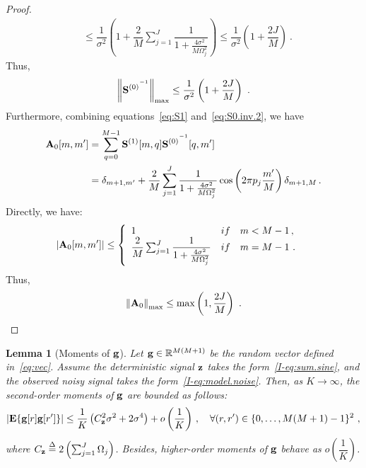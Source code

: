 \documentclass[journal,onecolumn]{IEEEtran}
\newtheorem{lemma}{Lemma}
\begin{document}
\begin{proof}
\begin{align*}
&\leq \dfrac1{\sigma^2}\left( 1+\dfrac{2}{M}\sum_{j=1}^J\dfrac{1}{1+\frac{4\sigma^2}{M\Omega_j^2}} \right) \leq \dfrac1{\sigma^2}\left( 1+\dfrac{2J}{M} \right)\ .
\end{align*}
Thus, 
\[
\left\|{{\mathbf S}^{(0)}}^{^{-1}}\right\|_{\max}\leq\dfrac1{\sigma^2}\left( 1+\dfrac{2J}{M} \right)\ .
\]
Furthermore, combining equations~\eqref{eq:S1} and~\eqref{eq:S0.inv.2}, we have
\begin{align*}
{\mathbf A}_0[m,m']  &= \sum_{q=0}^{M-1} {{\mathbf S}^{(1)}}[m,q]{{\mathbf S}^{(0)}}^{^{-1}}[q,m'] \\
&= \delta_{m+1,m'} + \dfrac2M\sum_{j=1}^J\dfrac{1}{1+\frac{4\sigma^2}{M\Omega_j^2}}\cos\left(2\pi p_j\frac{m'}{M}\right)\delta_{m+1,M}\,.
\end{align*}
Directly, we have:
\begin{align*}
\left|{\mathbf A}_0[m,m']\right| &\leq \left\{
\begin{array}{ll}
1 & \relax{if}\quad m<M-1\,, \\
\dfrac{2}{M}\sum_{j=1}^J\dfrac{1}{1+\frac{4\sigma^2}{M\Omega_j^2}} & \relax{if}\quad m=M-1\ . \\
\end{array}
\right.
\end{align*}
Thus, 
\[
\left\|{\mathbf A}_0\right\|_{\max}\leq \max\left(1,\frac{2J}{M}\right)\ .\qedhere
\]
\end{proof}

\begin{lemma}[Moments of ${\mathbf g}$]
Let ${\mathbf g}\in{\mathbb R}^{M(M+1)}$ be the random vector defined in~\eqref{eq:vec}. Assume the deterministic signal ${\mathbf z}$ takes the form~\eqref{I-eq:sum.sine}, and the observed noisy signal takes the form~\eqref{I-eq:model.noise}. Then, as $K\to\infty$, the second-order moments of ${\mathbf g}$ are bounded as follows:
\begin{equation}
\left|\bE\{\bg[r]\bg[r']\}\right| \leq \dfrac1K \left( C_\bz^2\sigma^2 + 2 \sigma^4\right) + o\left(\dfrac1K\right)\,,\quad\forall (r,r')\in\{0,\ldots,M(M+1)-1\}^2\ ,
\label{eq:gg.bound}
\end{equation}
where $C_{\mathbf z} \overset{\Delta}{=} 2\left(\sum_{j=1}^J \Omega_j\right)$. Besides, higher-order moments of ${\mathbf g}$ behave as $o\left( \dfrac1K \right)$.
\end{lemma}
\end{document}
